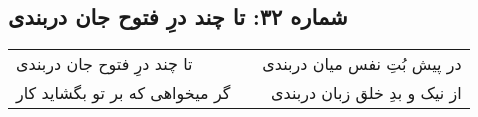 \begin{center}
\section*{شماره ۳۲: تا چند درِ فتوح جان دربندی}
\label{sec:032}
\begin{longtable}{l p{0.5cm} r}
تا چند درِ فتوح جان دربندی
&&
در پیش بُتِ نفس میان دربندی
\\
گر میخواهی که بر تو بگشاید کار
&&
از نیک و بدِ خلق زبان دربندی
\\
\end{longtable}
\end{center}
